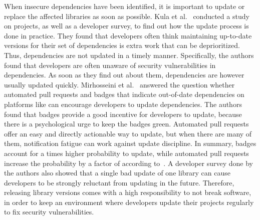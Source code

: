 When insecure dependencies have been identified, it is important to update or replace the affected libraries as soon as
possible.
Kula et al.~\cite{kula2017} conducted a study on \github{} projects, as well as a developer survey, to find out how the
update process is done in practice.
They found that developers often think maintaining up-to-date versions for their set of dependencies is extra work that
can be deprioritized.
Thus, dependencies are not updated in a timely manner.
Specifically, the authors found that developers are often unaware of security vulnerabilities in dependencies.
As soon as they find out about them, dependencies are however usually updated quickly.
Mirhosseini et al.~\cite{mirhosseini2017} answered the question whether automated pull requests and badges that indicate
out-of-date dependencies on platforms like \github{} can encourage developers to update dependencies.
The authors found that badges provide a good incentive for developers to update, because there is a psychological urge
to keep the badges green.
Automated pull requests offer an easy and directly actionable way to update, but when there are many of them,
notification fatigue can work against update discipline.
In summary, badges account for a  times higher probability to update, while automated pull requests
increase the probability by a factor of  according to~\cite{mirhosseini2017}.
A developer survey done by the authors also showed that a single bad update of one library can cause developers to be
strongly reluctant from updating in the future.
Therefore, releasing library versions comes with a high responsibility to not break software, in order to keep an
environment where developers update their projects regularly to fix security vulnerabilities.
